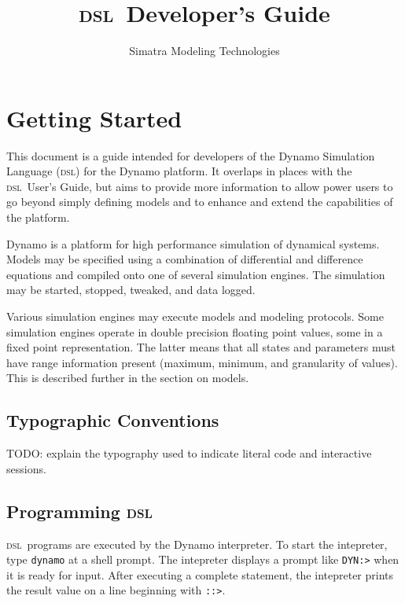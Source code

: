 \documentclass[11pt]{article}
\newcommand{\DSL}{{\scshape dsl}}
\begin{document}
\title{\DSL\ Developer's Guide}
\author{Simatra Modeling Technologies}
\maketitle

\tableofcontents
\newpage
\section {Getting Started}

This document is a guide intended for developers of the Dynamo
Simulation Language (\DSL) for the Dynamo platform.  It overlaps in
places with the \DSL\ User's Guide, but aims to provide more information
to allow power users to go beyond simply defining models and to
enhance and extend the capabilities of the platform.

Dynamo is a platform for high performance simulation of dynamical
systems.  Models may be specified using a combination of differential
and difference equations and compiled onto one of several simulation
engines.  The simulation may be started, stopped, tweaked, and data
logged.

Various simulation engines may execute models and modeling protocols.
Some simulation engines operate in double precision floating point
values, some in a fixed point representation.  The latter means that
all states and parameters must have range information present
(maximum, minimum, and granularity of values).  This is described
further in the section on models.

\subsection{Typographic Conventions}

TODO: explain the typography used to indicate literal code and interactive sessions.

\subsection{Programming \DSL}

\DSL\ programs are executed by the Dynamo interpreter. 
To start the intepreter, type \verb!dynamo! at a shell prompt.
The intepreter displays a prompt like \verb!DYN:>! when it is ready for input.
After executing a complete statement, the intepreter prints the result value
on a line beginning with \verb!::>!.
\end{document}
